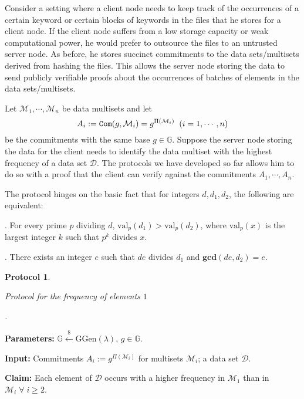 \documentclass[11pt, lettersize, notitlepage, leqno, footskip=0.6cm]{article}
\newcommand{\ttt}{\texttt}
\newcommand{\bG}{\mathbb{G}}
\newcommand{\mc}{\mathcal}
\newcommand{\mb}{\mathbb}
\newcommand{\mbf}{\mathbf}
\newcommand{\mr}{\mathrm}
\newcommand{\lamb}{\lambda}
\newcommand{\vs}{\vspace{-0.15cm}}
\newcommand{\noin}{\noindent}
\newcommand{\GCD}{\mbf{gcd}}
\newtheorem{Prot}[Thm]{Protocol}
\numberwithin{equation}{section}
\begin{document}
Consider a setting where a client node needs to keep track of the occurrences of a certain keyword or certain blocks of keywords in the files that he stores for a client node. If the client node suffers from a low storage capacity or weak computational power, he would prefer to outsource the files to an untrusted server node. As before, he stores succinct commitments to the data sets/multisets derived from hashing the files. This allows the server node storing the data to send publicly verifiable proofs about the occurrences of batches of elements in the data sets/multisets.

Let $\mc{M}_1,\cdots, \mc{M}_n$ be data multisets and let \vs $$A_i:= \ttt{Com}(g,\mc{M}_i) = g^{\Pi(\mc{M}_i)}\;\;(i=1,\cdots,n) \vs $$ be the commitments with the same base $g\in \bG$. Suppose the server node storing the data for the client needs to identify the data multiset with the highest frequency of a data set $\mc{D}$. The protocols we have developed so far allows him to do so with a proof that the client can verify against the commitments $A_1,\cdots,A_n$.

The protocol hinges on the basic fact that for integers $d,d_1,d_2$, the following are equivalent:

\noin 1. For every prime $p$ dividing $d$, $\mr{val}_p(d_1) > \mr{val}_p(d_2)$, where $\mr{val}_p(x)$ is the largest integer $k$ such that $p^k$ divides $x$.

\noin 2. There exists an integer $e$ such that $de$ divides $d_1$ and $\GCD(de, d_2) = e$.

\vspace{0.1cm}

\begin{Prot}\hypertarget{Freq}{Protocol for the frequency of elements $1$}.\end{Prot} \vspace{-0.3cm}

\noin \textbf{Parameters:} $\mb{G}\xleftarrow{\$} \mr{GGen}(\lamb)$,\; $g\in \mb{G}$.

\noin \textbf{Input:} Commitments $A_i := g^{\Pi(\mc{M}_i)}$ for multisets $\mc{M}_i$; a data set $\mc{D}$.

\noin \textbf{Claim:} Each element of $\mc{D}$ occurs with a higher frequency in $\mc{M}_1$ than in $\mc{M}_i\;\forall\;i\geq 2$.\vs
\end{document}
